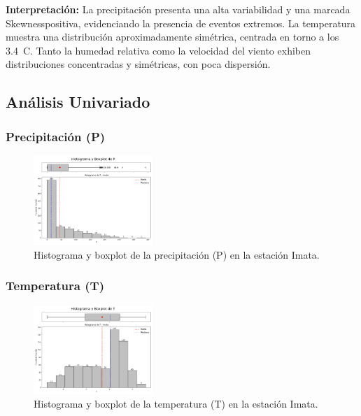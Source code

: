\textbf{Interpretación:} La precipitación presenta una alta variabilidad y una marcada Skewnesspositiva, evidenciando la presencia de eventos extremos. La temperatura muestra una distribución aproximadamente simétrica, centrada en torno a los 3.4~\degree C. Tanto la humedad relativa como la velocidad del viento exhiben distribuciones concentradas y simétricas, con poca dispersión.

\subsection{Análisis Univariado}

\subsubsection*{Precipitación (P)}
\begin{figure}[H]
\centering
\includegraphics[width=0.4\textwidth]{resultados/por_estacion_meteorologica/Imata/P_histograma.png}
\caption{Histograma y boxplot de la precipitación (P) en la estación Imata.}
\label{fig:imata_P}
\end{figure}

\subsubsection*{Temperatura (T)}
\begin{figure}[H]
\centering
\includegraphics[width=0.4\textwidth]{resultados/por_estacion_meteorologica/Imata/T_histograma.png}
\caption{Histograma y boxplot de la temperatura (T) en la estación Imata.}
\label{fig:imata_T}
\end{figure}

